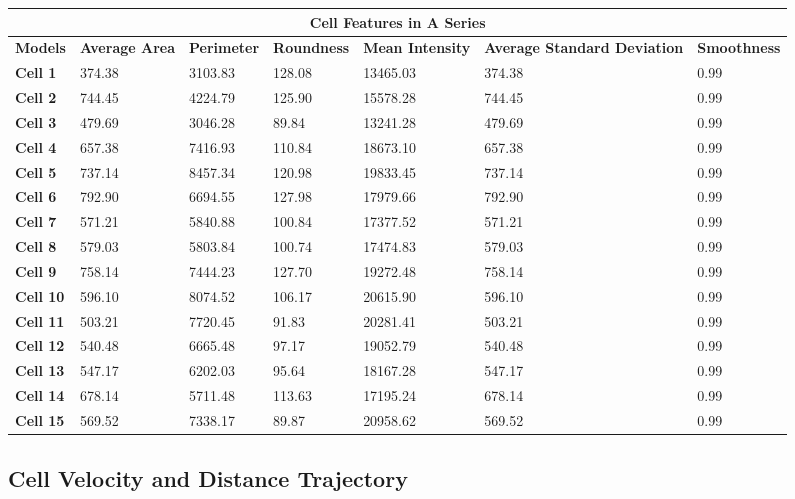 \documentclass{article}
\begin{document}
\begin{table}[h!]
\centering
\begin{tabular}{ |p{1.7cm}|p{1.7cm}|p{1.7cm}|p{1.7cm}|p{1.7cm}|p{1.7cm}|p{1.7cm}| }
\hline
\multicolumn{7}{|c|}{\textbf{Cell Features in A Series}} \\
\hline
\textbf{Models} & \textbf{Average Area} & \textbf{Perimeter} & \textbf{Roundness} & \textbf{Mean Intensity} & \textbf{Average Standard Deviation} & \textbf{Smoothness} \\
\hline
\textbf{Cell 1} & 374.38 & 3103.83 & 128.08 & 13465.03 & 374.38 & 0.99 \\
\textbf{Cell 2} & 744.45 & 4224.79 & 125.90 & 15578.28 & 744.45 & 0.99 \\
\textbf{Cell 3} & 479.69 & 3046.28 & 89.84 & 13241.28 & 479.69 & 0.99 \\
\textbf{Cell 4} & 657.38 & 7416.93 & 110.84 & 18673.10 & 657.38 & 0.99 \\
\textbf{Cell 5} & 737.14 & 8457.34 & 120.98 & 19833.45 & 737.14 & 0.99 \\
\textbf{Cell 6} & 792.90 & 6694.55 & 127.98 & 17979.66 & 792.90 & 0.99 \\
\textbf{Cell 7} & 571.21 & 5840.88 & 100.84 & 17377.52 & 571.21 & 0.99 \\
\textbf{Cell 8} & 579.03 & 5803.84 & 100.74 & 17474.83 & 579.03 & 0.99 \\
\textbf{Cell 9} & 758.14 & 7444.23 & 127.70 & 19272.48 & 758.14 & 0.99 \\
\textbf{Cell 10} & 596.10 & 8074.52 & 106.17 & 20615.90 & 596.10 & 0.99 \\
\textbf{Cell 11} & 503.21 & 7720.45 & 91.83 & 20281.41 & 503.21 & 0.99 \\
\textbf{Cell 12} & 540.48 & 6665.48 & 97.17 & 19052.79 & 540.48 & 0.99 \\
\textbf{Cell 13} & 547.17 & 6202.03 & 95.64 & 18167.28 & 547.17 & 0.99 \\
\textbf{Cell 14} & 678.14 & 5711.48 & 113.63 & 17195.24 & 678.14 & 0.99 \\
\textbf{Cell 15} & 569.52 & 7338.17 & 89.87 & 20958.62 & 569.52 & 0.99 \\

\hline
\end{tabular}
\end{table}







\subsection*{Cell Velocity and Distance Trajectory}
\end{document}
